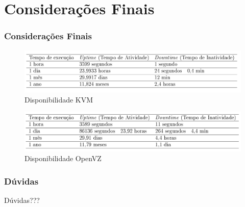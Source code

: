 \documentclass{beamer}
\begin{document}
    \section{Considerações Finais}
    \begin{frame}
     \frametitle{Considerações Finais}
     \begin{figure}
      \centering
      \includegraphics[scale=0.2]{imagens/TableKVM.jpg}
      \caption{Disponibilidade KVM}
     \end{figure}
     
     \begin{figure}
      \centering
      \includegraphics[scale=0.2]{imagens/TableOpenVZ.jpg}
      \caption{Disponibilidade OpenVZ}
     \end{figure}
    \end{frame}
    
    \begin{frame}
     \frametitle{Dúvidas}
     \centering
     \huge{Dúvidas???}
    \end{frame}
\end{document}

